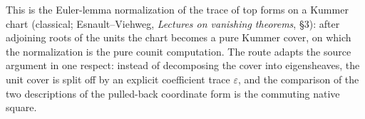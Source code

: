 This is the Euler-lemma normalization of the trace of top forms on a Kummer
chart (classical; Esnault--Viehweg, \emph{Lectures on vanishing theorems},
\S3): after adjoining roots of the units the chart becomes a pure Kummer cover,
on which the normalization is the pure counit computation. The route adapts the
source argument in one respect: instead of decomposing the cover into
eigensheaves, the unit cover is split off by an explicit coefficient trace
$\varepsilon$, and the comparison of the two descriptions of the pulled-back
coordinate form is the commuting native square.

